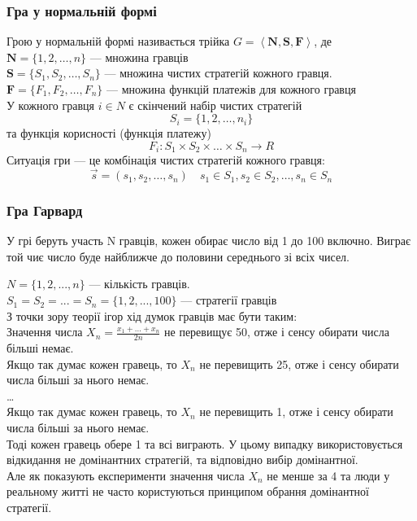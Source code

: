 \documentclass[a4paper]{article}
\begin{document}
\subsubsection{Гра у нормальній формі}
Грою у нормальній формі називається трійка $G=\left\langle \mathbf {N},\mathbf {S} ,\mathbf {F} \right\rangle $, де\\
$\mathbf {N} =\{1,2,\ldots ,n\}$ — множина гравців\\
$\mathbf {S} =\{S_{1},S_{2},\ldots ,S_{n}\}$ — множина чистих стратегій кожного гравця.\\
$\mathbf {F} =\{F_{1},F_{2},\ldots ,F_{n}\}$ — множина функцій платежів для кожного гравця\\
У кожного гравця $i\in N$ є скінчений набір чистих стратегій
$$S_i=\{1,2,\ldots ,n_{i}\}$$ та функція корисності (функція платежу)
$$F_{i}:S_{1}\times S_{2}\times \ldots \times S_{n}\rightarrow R$$
Ситуація гри — це комбінація чистих стратегій кожного гравця:\\
$${\vec {s}}=(s_{1},s_{2},\ldots ,s_{n})\quad s_{1}\in S_{1},s_{2}\in S_{2},\ldots ,s_{n}\in S_{n}$$

\subsubsection{Гра Гарвард}\label{garvard}
У грі беруть участь N гравців, кожен обирає число від 1 до 100 включно. Виграє той чиє число буде найближче до половини середнього зі всіх чисел.

\noindent$N = \{1,2, . . . , n\}$ — кількість гравців.\\
$S_{1} = S_{2} = ... = S_{n} = \{1,2,...,100\}$ — стратегії гравців\\
З точки зору теорії ігор хід думок гравців має бути таким:\\
Значення числа $X_{n} = \frac{x_{1}+...+x_{n}}{2n}$ не перевищує 50, отже і сенсу обирати числа більші немає.\\
Якщо так думає кожен гравець, то $X_{n}$ не перевищить 25, отже і сенсу обирати числа більші за нього немає.\\
\dots\\
Якщо так думає кожен гравець, то $X_{n}$ не перевищить 1, отже і сенсу обирати числа більші за нього немає.\\
Тоді кожен гравець обере 1 та всі виграють.
У цьому випадку використовується відкидання не домінантних стратегій, та відповідно вибір домінантної.\\
Але як показують експерименти значення числа $X_{n}$ не менше за 4 та люди у реальному житті не часто користуються принципом обрання домінантної стратегії.
\end{document}

